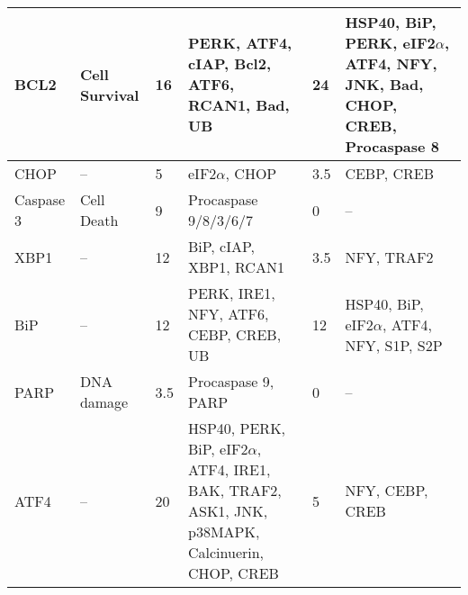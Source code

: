 \begin{center}
\tablelasttail{\hline}
\label{KO-O-table}
\begin{scriptsize}
\begin{supertabular}{|p{2cm}| p{2cm}| p{1.5cm}| p{3cm}| p{1.5cm}| p{3cm}|}  
\hline 

BCL2 & Cell Survival & 16 & PERK, ATF4, cIAP, Bcl2, ATF6, RCAN1, Bad, UB & 24 & HSP40, BiP, PERK, eIF2$\alpha$, ATF4, NFY, JNK, Bad, CHOP, CREB, Procaspase 8  \\
\hline
CHOP & -- & 5 & eIF2$\alpha$, CHOP & 3.5 & CEBP, CREB  \\
\hline
Caspase 3 & Cell Death & 9 & Procaspase 9/8/3/6/7 & 0 & --  \\
\hline
XBP1 & -- & 12 & BiP, cIAP, XBP1, RCAN1 & 3.5 & NFY, TRAF2  \\
\hline
BiP & -- & 12 & PERK, IRE1, NFY, ATF6, CEBP, CREB, UB & 12 & HSP40, BiP, eIF2$\alpha$, ATF4, NFY, S1P, S2P  \\
\hline
PARP & DNA damage & 3.5 & Procaspase 9, PARP & 0 & -- \\
\hline
ATF4 & -- & 20 & HSP40, PERK, BiP, eIF2$\alpha$, ATF4, IRE1, BAK, TRAF2, ASK1, JNK, p38MAPK, Calcinuerin, CHOP, CREB & 5 & NFY, CEBP, CREB \\

\end{supertabular}
\end{scriptsize}
\end{center}

